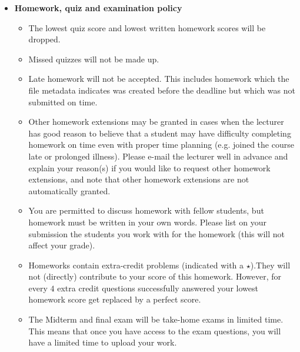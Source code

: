 \documentclass[11pt]{article}
\begin{document}
\begin{itemize}
	\item \textbf{Homework, quiz and examination policy}
	\begin{itemize}
		\item The lowest quiz score and lowest written homework scores will be dropped.
		\item Missed quizzes will not be made up.
		\item Late homework will not be accepted. This includes homework which the file metadata indicates was created before the deadline but which was not submitted on time. 
		\item Other homework extensions may be granted in cases when the lecturer has good reason to believe that a student may have difficulty completing homework on time even with proper time planning (e.g. joined the course late or prolonged illness). Please e-mail the lecturer well in advance and explain your reason(s) if you would like to request other homework extensions, and note that other homework extensions are not automatically granted.
		\item You are permitted to discuss homework with fellow students, but homework must be written in your own words. Please list on your submission the students you work with for the homework (this will not affect your grade).
		\item Homeworks contain extra-credit problems (indicated with a $\star$).They will not (directly) contribute to your score of this homework. However, for every $4$ extra credit questions successfully answered your lowest homework score get replaced by a perfect score.
		\item The Midterm and final exam will be take-home exams in limited time. This means that once you have access to the exam questions, you will have a limited time to upload your work.
	\end{itemize}
	


\end{itemize}
\end{document}
